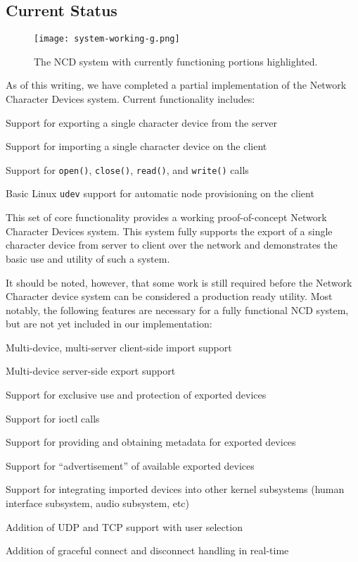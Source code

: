 \documentclass[11pt,twocolumn]{article}
\newenvironment{packed_item}{
\begin{itemize}
  \setlength{\itemsep}{1pt}
  \setlength{\parskip}{0pt}
  \setlength{\parsep}{0pt}
}{\end{itemize}}
\begin{document}
\subsection{Current Status}
\label{sec:currentstatus}

\begin{figure}[h]
  \centering
  \texttt{[image: system-working-g.png]}
  \caption{The NCD system with currently functioning portions
    highlighted.}
  \label{fig:system-working}
\end{figure}

As of this writing, we have completed a partial implementation of
the Network Character Devices system. Current functionality includes:

\begin{packed_item}
\item Support for exporting a single character device from the server
\item Support for importing a single character device on the client
\item Support for \texttt{open()}, \texttt{close()}, \texttt{read()},
  and \texttt{write()} calls
\item Basic Linux \texttt{udev} support for automatic node
  provisioning on the client
\end{packed_item}

This set of core functionality provides a working proof-of-concept
Network Character Devices system. This system fully supports the
export of a single character device from server to client over the
network and demonstrates the basic use and utility of such a system.

It should be noted, however, that some work is still required before
the Network Character device system can be considered a production
ready utility. Most notably, the following features are necessary for
a fully functional NCD system, but are not yet included in our
implementation:

\begin{packed_item}
\item Multi-device, multi-server client-side import support
\item Multi-device server-side export support
\item Support for exclusive use and protection of exported devices
\item Support for ioctl calls
\item Support for providing and obtaining metadata for exported
  devices
\item Support for ``advertisement'' of available exported devices
\item Support for integrating imported devices into other kernel
  subsystems (human interface subsystem, audio subsystem, etc)
\item Addition of UDP and TCP support with user selection
\item Addition of graceful connect and disconnect handling in real-time
\end{packed_item}
\end{document}
